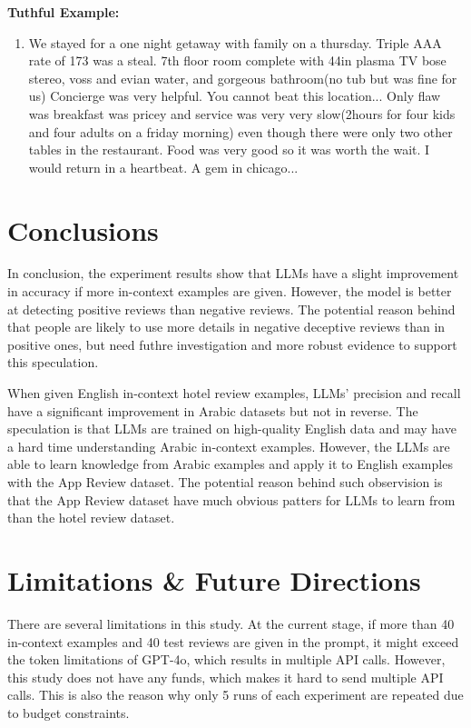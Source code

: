 \documentclass[sigconf, nonacm]{acmart}
\newenvironment{example}
{\begin{mdframed}[
    linecolor=exampleborder,
    linewidth=0.5pt,
    backgroundcolor=examplecolor,
    topline=false,
    bottomline=false,
    leftline=true,
    rightline=false,
    innertopmargin=2pt,
    innerbottommargin=2pt,
    innerleftmargin=5pt,
    innerrightmargin=5pt,
    skipabove=10pt,
    skipbelow=10pt
]}
{\end{mdframed}}
\theoremstyle{definition}
\begin{document}
\begin{example}
  \textbf{Tuthful Example:}
  \begin{enumerate}
    \item We stayed for a one night getaway with family on a thursday. Triple AAA rate of 173 was a steal. 7th floor room complete with 44in plasma TV bose stereo, voss and evian water, and gorgeous bathroom(no tub but was fine for us) Concierge was very helpful. You cannot beat this location... Only flaw was breakfast was pricey and service was very very slow(2hours for four kids and four adults on a friday morning) even though there were only two other tables in the restaurant. Food was very good so it was worth the wait. I would return in a heartbeat. A gem in chicago...
  \end{enumerate}
\end{example}

\section{Conclusions}
In conclusion, the experiment results show that LLMs have a slight improvement in accuracy if more in-context examples are given. However, the model is better at detecting positive reviews than negative reviews. The potential reason behind that people are likely to use more details in negative deceptive reviews than in positive ones, but need futhre investigation and more robust evidence to support this speculation.

When given English in-context hotel review examples, LLMs' precision and recall have a significant improvement in Arabic datasets but not in reverse. The speculation is that LLMs are trained on high-quality English data and may have a hard time understanding Arabic in-context examples. However, the LLMs are able to learn knowledge from Arabic examples and apply it to English examples with the App Review dataset. The potential reason behind such observision is that the App Review dataset have much obvious patters for LLMs to learn from than the hotel review dataset.

\section{Limitations \& Future Directions}
There are several limitations in this study. At the current stage, if more than 40 in-context examples and 40 test reviews are given in the prompt, it might exceed the token limitations of GPT-4o, which results in multiple API calls. However, this study does not have any funds, which makes it hard to send multiple API calls. This is also the reason why only 5 runs of each experiment are repeated due to budget constraints.
\end{document}
